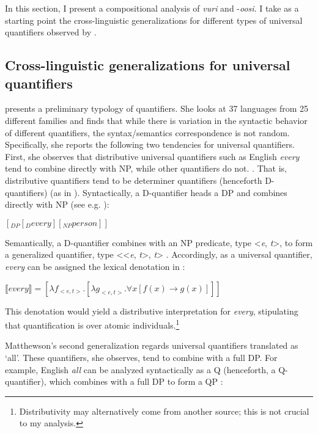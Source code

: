\documentclass[output=paper]{langsci/langscibook}
\begin{document}
In this section, I present a compositional analysis of \textit{vuri} and -\textit{oosi}. I take as a starting point the cross-linguistic generalizations for different types of universal quantifiers observed by \citet{Matthewson2013}. 

\subsection{Cross-linguistic generalizations for universal quantifiers}

\citet{Matthewson2013} presents a preliminary typology of quantifiers. She looks at 37 languages from 25 different families and finds that while there is variation in the syntactic behavior of different quantifiers, the syntax/semantics correspondence is not random. Specifically, she reports the following two tendencies for universal quantifiers. First, she observes that distributive universal quantifiers such as English \textit{every} tend to {\textquotedbl}combine directly with NP, while other quantifiers do not.{\textquotedbl} \citep[36]{Matthewson2013}. That is, distributive quantifiers tend to be determiner quantifiers (henceforth D-quantifiers) (as in \citealt{BarwiseCooper1981}). Syntactically, a D-quantifier heads a DP and combines directly with NP (see e.g. \citealt[146]{HeimKratzer1998}): 

\ea\label{ex:landman:}
$[_{DP} [_{D} every] [_{NP} person]]$
\z

Semantically, a D-quantifier combines with an NP predicate, type <\textit{e}, \textit{t}>, to form a generalized quantifier, type <<\textit{e}, \textit{t}>, \textit{t}> \citep{Montague1973,BarwiseCooper1981}. Accordingly, as a universal quantifier, \textit{every} can be assigned the lexical denotation in :
 
\ea\label{ex:landman:15}
$⟦every⟧ = [{\lambda}f_{<e,t>} . [{\lambda}g_{<e,t>}. {\forall}x [f(x) \to g(x)]]]$
\z

This denotation would yield a distributive interpretation for \textit{every}, stipulating that quantification is over atomic individuals.\footnote{ Distributivity may alternatively come from another source; this is not crucial to my analysis.}

Matthewson's second generalization regards universal quantifiers translated as ‘all’. These quantifiers, she observes, tend to combine with a full DP. For example, English \textit{all} can be analyzed syntactically as a Q (henceforth, a Q-quantifier), which combines with a full DP to form a QP \citep{Matthewson2001}:  
\end{document}
